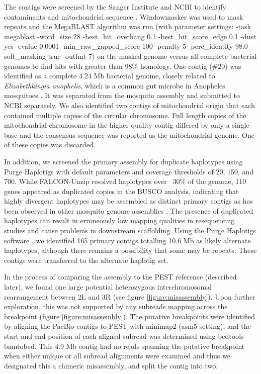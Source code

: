 \par{
The contigs were screened by the Sanger Institute and NCBI to identify contaminants and mitochondrial sequence \cite{sangercuration}. Windowmasker was used to mask repeats and the MegaBLAST algorithm was run (with parameter settings: -task megablast -word\_size 28 -best\_hit\_overhang 0.1 -best\_hit\_score\_edge 0.1 -dust yes -evalue 0.0001 -min\_raw\_gapped\_score 100 -penalty 5 -perc\_identity 98.0 -soft\_masking true -outfmt 7) on the masked genome versus all complete bacterial genomes to find hits with  greater than 98\% homology\cite{windowmasker}\cite{megablast}. One contig (\#20) was identified as a complete 4.24 Mb bacterial genome, closely related to \textit{Elizabethkingia anophelis}, which is a common gut microbe in Anopheles mosquitoes \cite{kingia}\cite{blobtoolkit}. It was separated from the mosquito assembly and submitted to NCBI separately. We also identified two contigs of mitochondrial origin that each contained multiple copies of the circular chromosome. Full length copies of the mitochondrial chromosome in the higher quality contig differed by only a single base and the consensus sequence was reported as the mitochondrial genome. One of these copies was discarded.
} \\

\par{
In addition, we screened the primary assembly for duplicate haplotypes using Purge Haplotigs \cite{purge} with default parameters and coverage thresholds of 20, 150, and 700. While FALCON-Unzip resolved haplotypes over ~30\% of the genome, 110 genes appeared as duplicated copies in the BUSCO analysis, indicating that highly divergent haplotypes may be assembled as distinct primary contigs as has been observed in other mosquito genome assemblies \cite{aegypti}\cite{funestus}. The presence of duplicated haplotypes can result in erroneously low mapping qualities in resequencing studies and cause problems in downstream scaffolding. Using the Purge Haplotigs software \cite{purge}, we identified 165 primary contigs totalling 10.6 Mb as likely alternate haplotypes, although there remains a possibility that some may be repeats. These contigs were transferred to the alternate haplotig set.
} \\


\par{
In the process of comparing the assembly to the PEST reference (described later), we found one large potential heterozygous interchromosomal rearrangement between 2L and 3R (see figure \ref{figure:misassembly}). Upon further exploration, this was not supported by any subreads mapping across the breakpoint (figure \ref{figure:misassembly}). The putative breakpoints were identified by aligning the PacBio contigs to PEST with minimap2 (asm5 setting)\cite{minimap2}, and the start and end position of each aligned subread was determined using bedtools bamtobed\cite{bedtools}. This 4.9 Mb contig had no reads spanning the putative breakpoint when either unique or all subread alignments were examined and thus we designated this a chimeric misassembly, and split the contig into two.
}



